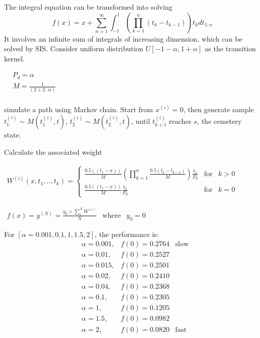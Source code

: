 \documentclass{article}
\begin{document}
The integral equation can be transformed into solving
\begin{equation}
    f(x) = x + \sum_{n=1}^{\infty} \int_{-1}^{1} (\prod_{k=1}^{n}(t_{k}-t_{k-1}))t_k dt_{1:n}
\end{equation}
It involves an infinite sum of integrals of increasing dimension, which can be solved by SIS.
Consider uniform distribution $U[-1-\alpha,1+\alpha]$ as the transition kernel.

\begin{math}
\begin{aligned}
& P_{d} = \alpha \\
& M = \frac{1}{(2+2\cdot\alpha)} \\
\end{aligned}
\end{math}

simulate a path using Markov chain. Start from $x^{(i)}=0$, then generate sample $t_{1}^{(i)} \sim M(t_{1}^{(i)},t)$, $t_{2}^{(i)} \sim M(t_{2}^{(i)},t)$, until $t_{k+1}^{(i)}$ reaches $s$, the cemetery state.

Calculate the associated weight

\begin{math}
\begin{aligned}
W^{(i)} (x,t_{1},..,t_{k}) =     \left\{ \begin{array}{rcl}
     \frac{0.5((t_{1}-x))}{M} (\prod^{n}_{k=1} \frac{0.5(t_{k}-t_{k-1})}{M})\frac{t_{k}}{P_{d}} & \mbox{for}
   & k>0 \\ 
   \frac{0.5((t_{1}-x))}{M} \frac{t_{k}}{P_{d}} & \mbox{for} & k=0
 \end{array}\right.
\end{aligned}
\end{math}


\begin{math}
\begin{aligned}
f(x) = y^{(N)}  = \frac{y_{0} + \sum_{i}^{N}W^{(i)}}{N} & \mbox{where} & y_{0}=0
\end{aligned}
\end{math}

For $[\alpha=0.001,0.1,1,1.5,2]$, the performance is: 
\begin{equation}
\begin{aligned}
& \alpha = 0.001, & f(0) = 0.2764 & \mbox{slow}\\
& \alpha = 0.01, & f(0) = 0.2527 \\
& \alpha = 0.015, & f(0) = 0.2501 \\
& \alpha = 0.02, & f(0) = 0.2410 \\
& \alpha = 0.04, & f(0) = 0.2368 \\
& \alpha = 0.1, & f(0) = 0.2305 \\
& \alpha = 1, & f(0) = 0.1205 \\
& \alpha = 1.5, & f(0) = 0.0982 \\
& \alpha = 2, & f(0) = 0.0820 & \mbox{fast} 
\end{aligned}
\end{equation}
\end{document}
